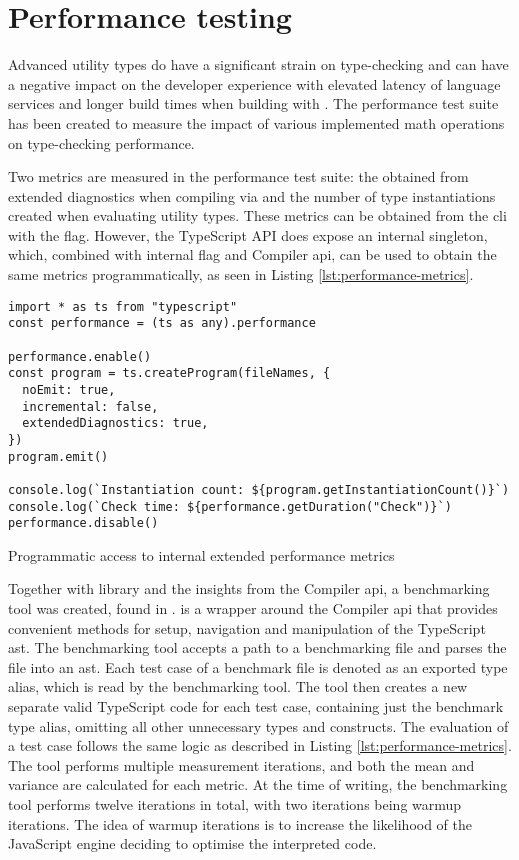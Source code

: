 \section{Performance testing}

Advanced utility types do have a significant strain on type-checking and can have a negative impact on the developer experience with elevated latency of language services and longer build times when building with . The performance test suite has been created to measure the impact of various implemented math operations on type-checking performance.

Two metrics are measured in the performance test suite: the  obtained from extended diagnostics when compiling via  and the number of type instantiations created when evaluating utility types. These metrics can be obtained from the  \acrshort{cli} with the  flag. However, the TypeScript API does expose an internal  singleton, which, combined with internal  flag and Compiler \acrshort{api}, can be used to obtain the same metrics programmatically, as seen in Listing \ref{lst:performance-metrics}.

\begin{listing}[ht]
  \begin{verbatim}
import * as ts from "typescript"
const performance = (ts as any).performance

performance.enable()
const program = ts.createProgram(fileNames, {
  noEmit: true,
  incremental: false,
  extendedDiagnostics: true,
})
program.emit()

console.log(`Instantiation count: ${program.getInstantiationCount()}`)
console.log(`Check time: ${performance.getDuration("Check")}`)
performance.disable()
\end{verbatim}
  \caption{Programmatic access to internal extended performance metrics}\label{lst:performance-metrics}
\end{listing}

Together with  library \cite{sherretTsmorph2023} and the insights from the Compiler \acrshort{api}, a benchmarking tool was created, found in .  is a wrapper around the Compiler \acrshort{api} that provides convenient methods for setup, navigation and manipulation of the TypeScript \acrshort{ast}. The benchmarking tool accepts a path to a benchmarking file and parses the file into an \acrshort{ast}. Each test case of a benchmark file is denoted as an exported type alias, which is read by the benchmarking tool. The tool then creates a new separate valid TypeScript code for each test case, containing just the benchmark type alias, omitting all other unnecessary types and constructs. The evaluation of a test case follows the same logic as described in Listing \ref{lst:performance-metrics}. The tool performs multiple measurement iterations, and both the mean and variance are calculated for each metric. At the time of writing, the benchmarking tool performs twelve iterations in total, with two iterations being warmup iterations. The idea of warmup iterations is to increase the likelihood of the JavaScript engine deciding to optimise the interpreted code.

